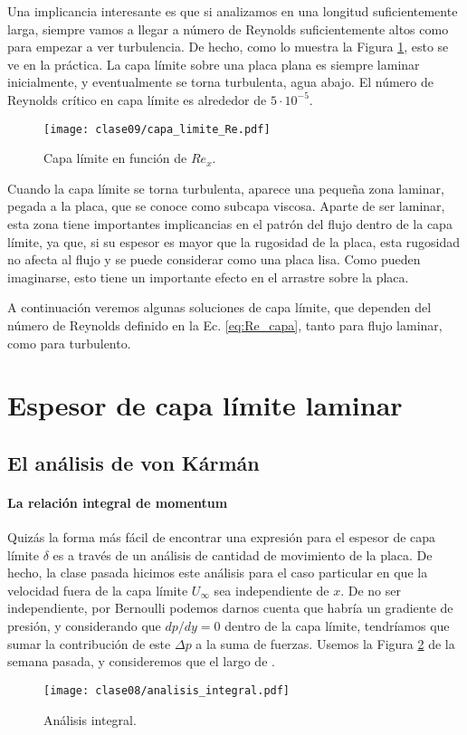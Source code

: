 Una implicancia interesante es que si analizamos en una longitud suficientemente larga, siempre vamos a llegar a número de Reynolds suficientemente altos como para empezar a ver turbulencia.
De hecho, como lo muestra la Figura \ref{fig:capa_limite_Re}, esto se ve en la práctica. 
La capa límite sobre una placa plana es siempre laminar inicialmente, y eventualmente se torna turbulenta, agua abajo.
El número de Reynolds crítico en capa límite es alrededor de $5\cdot10^{-5}$.
%
\begin{figure}[!h]
\centering
\texttt{[image: clase09/capa\_limite\_Re.pdf]}
\caption{Capa límite en función de $Re_x$.}
\label{fig:capa_limite_Re}
\end{figure}

Cuando la capa límite se torna turbulenta, aparece una pequeña zona laminar, pegada a la placa, que se conoce como subcapa viscosa.
Aparte de ser laminar, esta zona tiene importantes implicancias en el patrón del flujo dentro de la capa límite, ya que, si su espesor es mayor que la rugosidad de la placa, esta rugosidad no afecta al flujo y se puede considerar como una placa lisa. 
Como pueden imaginarse, esto tiene un importante efecto en el arrastre sobre la placa.

A continuación veremos algunas soluciones de capa límite, que dependen del número de Reynolds definido en la Ec. \eqref{eq:Re_capa}, tanto para flujo laminar, como para turbulento.

\section*{Espesor de capa límite laminar}

\subsection*{El análisis de von Kármán}
\paragraph*{La relación integral de momentum}

Quizás la forma más fácil de encontrar una expresión para el espesor de capa límite $\delta$ es a través de un análisis de cantidad de movimiento de la placa.
De hecho, la clase pasada hicimos este análisis para el caso particular en que la velocidad fuera de la capa límite $U_\infty$ sea independiente de $x$.
De no ser independiente, por Bernoulli podemos darnos cuenta que habría un gradiente de presión, y considerando que $dp/dy=0$ dentro de la capa límite, tendríamos que sumar la contribución de este $\Delta p$ a la suma de fuerzas.
Usemos la Figura \ref{fig:analisis_integral} de la semana pasada, y consideremos que el largo de .
%
\begin{figure}[!h]
\centering
\texttt{[image: clase08/analisis\_integral.pdf]}
\caption{Análisis integral.}
\label{fig:analisis_integral}
\end{figure}

